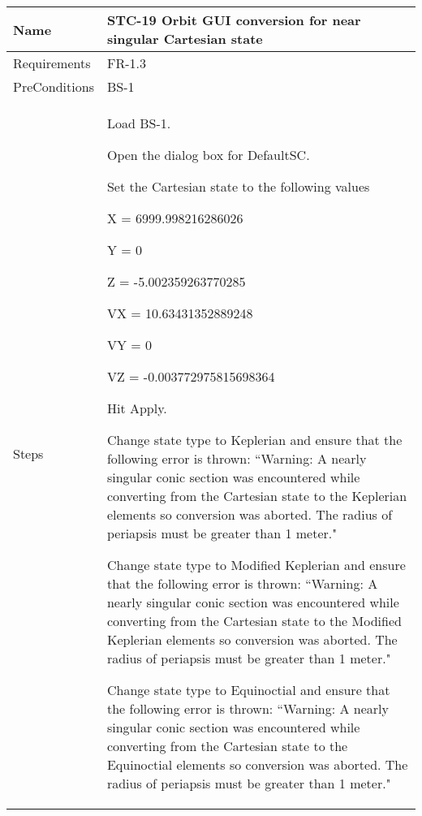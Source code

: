 \begin{table}[htbp!]
\centering\footnotesize
      \begin{tabular}{|p{1.05 in} |p{4.75 in} |}
      \hline
         \rowcolor[rgb]{0.8,0.8,0.8} Name & STC-19 Orbit GUI conversion for near singular Cartesian state\\
         \hline
         Requirements & FR-1.3\\  \hline
         PreConditions & BS-1\\     \hline
        Steps &
         \begin{compactenum}
             \item Load BS-1.
             \item Open the dialog box for DefaultSC.
             \item Set the Cartesian state to the following values
                 \begin{compactenum}
                    \item X  = 6999.998216286026
                    \item Y = 0
                    \item Z = -5.002359263770285
                    \item VX = 10.63431352889248
                    \item VY = 0
                    \item VZ =  -0.003772975815698364
                    \end{compactenum}
             \item Hit Apply.
             \item Change state type to Keplerian and ensure that the following error is thrown: ``Warning: A nearly singular conic section was encountered while converting from the Cartesian state to the Keplerian elements so conversion was aborted.  The radius of periapsis must be greater than 1 meter."
             \item Change state type to Modified Keplerian and ensure that the following error is thrown: ``Warning: A nearly singular conic section was encountered while converting from the Cartesian state to the Modified Keplerian elements so conversion was aborted.  The radius of periapsis must be greater than 1 meter."
             \item Change state type to Equinoctial and ensure that the following error is thrown:  ``Warning: A nearly singular conic section was encountered while converting from the Cartesian state to the Equinoctial elements so conversion was aborted.  The radius of periapsis must be greater than 1 meter."

\end{compactenum}
\end{tabular}
\end{table}
